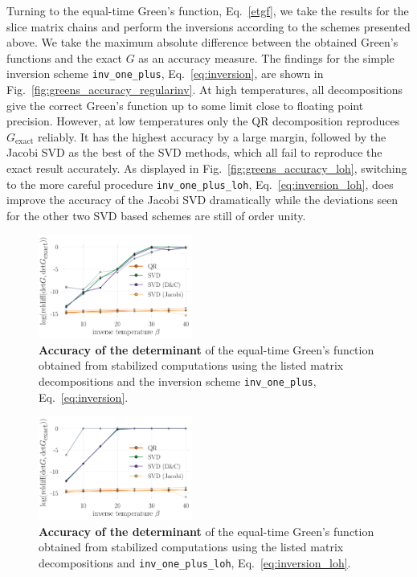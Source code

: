 \documentclass[%
 reprint,
superscriptaddress,
citeautoscript,
showpacs,
 amsmath,amssymb,
 aps,
 prb,
longbibliography,
]{revtex4-2}
\begin{document}
Turning to the equal-time Green's function, Eq.~\ref{etgf}, we take the results for the slice matrix chains and perform the inversions according to the schemes presented above. We take the maximum absolute difference between the obtained Green's functions and the exact $G$ as an accuracy measure. The findings for the simple inversion scheme \texttt{inv\_one\_plus}, Eq.~\ref{eq:inversion}, are shown in Fig.~\ref{fig:greens_accuracy_regularinv}. At high temperatures, all decompositions give the correct Green's function up to some limit close to floating point precision. However, at low temperatures only the QR decomposition reproduces $G_{\textrm{exact}}$ reliably. It has the highest accuracy by a large margin, followed by the Jacobi SVD as the best of the SVD methods, which all fail to reproduce the exact result accurately. As displayed in Fig.~\ref{fig:greens_accuracy_loh}, switching to the more careful procedure \texttt{inv\_one\_plus\_loh}, Eq.~\ref{eq:inversion_loh}, does improve the accuracy of the Jacobi SVD dramatically while the deviations seen for the other two SVD based schemes are still of order unity.
\begin{figure}
	\includegraphics[width=0.45\textwidth]{figures/accuracy_det_svd_regularinv.pdf}
	\caption{\textbf{Accuracy of the determinant} of the equal-time Green's function obtained from stabilized computations using the listed matrix decompositions and the inversion scheme \texttt{inv\_one\_plus}, Eq.~\ref{eq:inversion}. \label{fig:det_accuracy_regularinv}}
\end{figure}

\begin{figure}
	\includegraphics[width=0.45\textwidth]{figures/accuracy_det_svd_loh.pdf}
	\caption{\textbf{Accuracy of the determinant} of the equal-time Green's function obtained from stabilized computations using the listed matrix decompositions and \texttt{inv\_one\_plus\_loh}, Eq.~\ref{eq:inversion_loh}. \label{fig:det_accuracy_loh}}
\end{figure}
\end{document}
